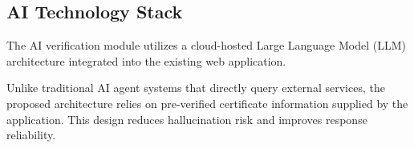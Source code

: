 \subsection{AI Technology Stack}

    The AI verification module utilizes a cloud-hosted Large Language Model (LLM) architecture integrated into the existing web application.

    

    Unlike traditional AI agent systems that directly query external services, the proposed architecture relies on pre-verified certificate information supplied by the application. This design reduces hallucination risk and improves response reliability.